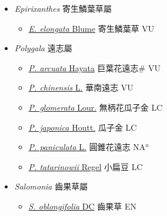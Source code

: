 
  \begin{itemize}
 \item[] \textit{Epirixanthes} 寄生鱗葉草屬
                    
  \begin{itemize}
        \item[] \href{http://www.theplantlist.org/tpl1.1/search?q=Epirixanthes+elongata}{\textit{E. elongata} Blume}   寄生鱗葉草 VU
  \end{itemize}
 \item[] \textit{Polygala} 遠志屬
                    
  \begin{itemize}
        \item[] \href{http://www.theplantlist.org/tpl1.1/search?q=Polygala+arcuata}{\textit{P. arcuata} Hayata}   巨葉花遠志\# VU
        \item[] \href{http://www.theplantlist.org/tpl1.1/search?q=Polygala+chinensis}{\textit{P. chinensis} L.}   華南遠志 VU
        \item[] \href{http://www.theplantlist.org/tpl1.1/search?q=Polygala+glomerata}{\textit{P. glomerata} Lour.}   無柄花瓜子金 LC
        \item[] \href{http://www.theplantlist.org/tpl1.1/search?q=Polygala+japonica}{\textit{P. japonica} Houtt.}   瓜子金 LC
        \item[] \href{http://www.theplantlist.org/tpl1.1/search?q=Polygala+paniculata}{\textit{P. paniculata} L.}   圓錐花遠志 NA$^n$
        \item[] \href{http://www.theplantlist.org/tpl1.1/search?q=Polygala+tatarinowii}{\textit{P. tatarinowii} Regel}   小扁豆 LC
  \end{itemize}
 \item[] \textit{Salomonia} 齒果草屬
                    
  \begin{itemize}
        \item[] \href{http://www.theplantlist.org/tpl1.1/search?q=Salomonia+oblongifolia}{\textit{S. oblongifolia} DC}   齒果草 EN
  \end{itemize}
  \end{itemize}
